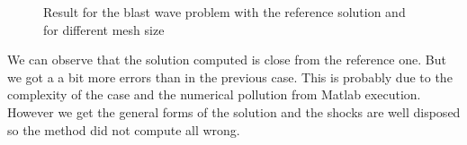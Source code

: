 \begin{figure}[H]
\hspace{-1.3cm}
\begin{minipage}{.5\linewidth}
\centering
{}
\end{minipage}
\hfill
\begin{minipage}{.5\linewidth}
\centering
{}
\end{minipage}
\vspace{0.5cm}
\hspace{-1.3cm}
\begin{minipage}{.5\linewidth}
\centering
{}
\end{minipage}
\hfill
\begin{minipage}{.5\linewidth}
\centering
{} 
\end{minipage}
\caption{Result for the blast wave problem with the reference solution and for different mesh size}
\end{figure}

We can observe that the solution computed is close from the reference one. But we got a a bit more errors than in the previous case. This is  probably due to the complexity of the case and the numerical pollution from Matlab execution. However we get the general forms of the solution and the shocks are well disposed so the method did not compute all wrong.

\newpage 
